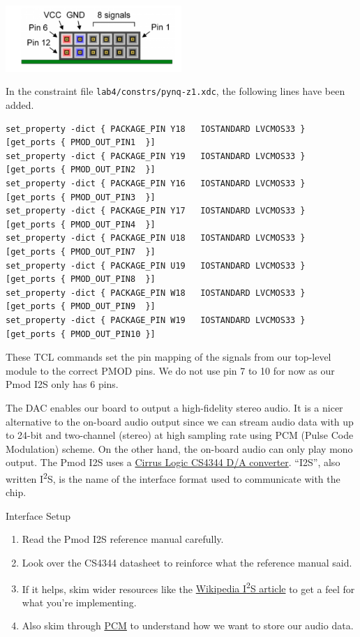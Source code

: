 \documentclass[11pt]{article}
\makeatletter
\renewcommand{\subsection}
{\@startsection {subsection}{1}{0pt}
 {-1ex}
 {0.5ex}
 {\bfseries\normalsize}}
\newcommand{\itwos}{I\textsuperscript{2}S}
\makeatother
\begin{document}
\begin{center}
\includegraphics[width=0.5\textwidth]{figs/pmod_pins.png}
\end{center}

In the constraint file \verb|lab4/constrs/pynq-z1.xdc|, the following lines have been added.

\begin{verbatim}
set_property -dict { PACKAGE_PIN Y18   IOSTANDARD LVCMOS33 } [get_ports { PMOD_OUT_PIN1  }]
set_property -dict { PACKAGE_PIN Y19   IOSTANDARD LVCMOS33 } [get_ports { PMOD_OUT_PIN2  }]
set_property -dict { PACKAGE_PIN Y16   IOSTANDARD LVCMOS33 } [get_ports { PMOD_OUT_PIN3  }]
set_property -dict { PACKAGE_PIN Y17   IOSTANDARD LVCMOS33 } [get_ports { PMOD_OUT_PIN4  }]
set_property -dict { PACKAGE_PIN U18   IOSTANDARD LVCMOS33 } [get_ports { PMOD_OUT_PIN7  }]
set_property -dict { PACKAGE_PIN U19   IOSTANDARD LVCMOS33 } [get_ports { PMOD_OUT_PIN8  }]
set_property -dict { PACKAGE_PIN W18   IOSTANDARD LVCMOS33 } [get_ports { PMOD_OUT_PIN9  }]
set_property -dict { PACKAGE_PIN W19   IOSTANDARD LVCMOS33 } [get_ports { PMOD_OUT_PIN10 }]
\end{verbatim}

These TCL commands set the pin mapping of the signals from our top-level module to the correct PMOD pins. We do not use pin 7 to 10 for now as our Pmod I2S only has 6 pins.

The DAC enables our board to output a high-fidelity stereo audio. It is a nicer alternative to the on-board audio output since we can stream audio data with up to 24-bit and two-channel (stereo) at high sampling rate using PCM (Pulse Code Modulation) scheme. On the other hand, the on-board audio can only play mono output. The Pmod I2S uses a \href{https://d3uzseaevmutz1.cloudfront.net/pubs/proDatasheet/CS4344-45-48_F2.pdf}{Cirrus Logic CS4344 D/A converter}. ``I2S'', also written I\textsuperscript{2}S, is the name of the interface format used to communicate with the chip.

\subsection{Interface Setup}

\begin{enumerate}
  \item Read the Pmod I2S reference manual carefully.
  \item Look over the CS4344 datasheet to reinforce what the reference manual said.
  \item If it helps, skim wider resources like the \href{https://en.wikipedia.org/wiki/I\%C2\%B2S}{Wikipedia \itwos{} article} to get a feel for what you're implementing.
  \item Also skim through \href{https://en.wikipedia.org/wiki/Pulse-code_modulation}{PCM} to understand how we want to store our audio data.
\end{enumerate}
\end{document}
